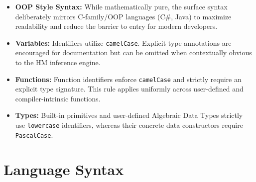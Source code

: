 \documentclass[11pt, a4paper]{article}
\begin{document}
\begin{itemize}
    \item \textbf{OOP Style Syntax:} While mathematically pure, the surface syntax deliberately mirrors C-family/OOP languages (C\#, Java) to maximize readability and reduce the barrier to entry for modern developers.
    \item \textbf{Variables:} Identifiers utilize \texttt{camelCase}. Explicit type annotations are encouraged for documentation but can be omitted when contextually obvious to the HM inference engine.
    \item \textbf{Functions:} Function identifiers enforce \texttt{camelCase} and strictly require an explicit type signature. This rule applies uniformly across user-defined and compiler-intrinsic functions.
    \item \textbf{Types:} Built-in primitives and user-defined Algebraic Data Types strictly use \texttt{lowercase} identifiers, whereas their concrete data constructors require \texttt{PascalCase}.
\end{itemize}

\section{Language Syntax}

\end{document}

